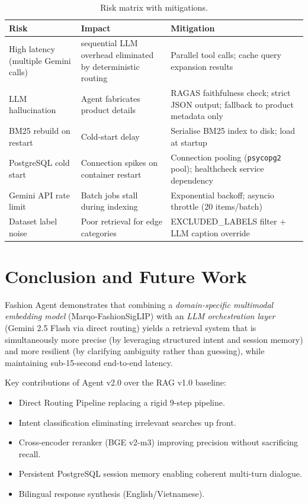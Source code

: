 \documentclass[12pt,a4paper]{article}
\begin{document}
\begin{table}[H]
\centering
\begin{tabularx}{\linewidth}{lXX}
\toprule
\textbf{Risk} & \textbf{Impact} & \textbf{Mitigation} \\
\midrule
High latency (multiple Gemini calls) & sequential LLM overhead eliminated by deterministic routing & Parallel tool calls; cache query expansion results \\
LLM hallucination & Agent fabricates product details & RAGAS faithfulness check; strict JSON output; fallback to product metadata only \\
BM25 rebuild on restart & Cold-start delay & Serialise BM25 index to disk; load at startup \\
PostgreSQL cold start & Connection spikes on container restart & Connection pooling (\texttt{psycopg2} pool); healthcheck service dependency \\
Gemini API rate limit & Batch jobs stall during indexing & Exponential backoff; asyncio throttle (20 items/batch) \\
Dataset label noise & Poor retrieval for edge categories & EXCLUDED\_LABELS filter + LLM caption override \\
\bottomrule
\end{tabularx}
\caption{Risk matrix with mitigations.}
\label{tab:risks}
\end{table}

\section{Conclusion and Future Work}
\label{sec:conclusion}

Fashion Agent demonstrates that combining a \emph{domain-specific
multimodal embedding model} (Marqo-FashionSigLIP) with an
\emph{LLM orchestration layer} (Gemini 2.5 Flash via direct routing)
yields a retrieval system that is simultaneously more precise
(by leveraging structured intent and session memory) and more
resilient (by clarifying ambiguity rather than guessing), while
maintaining sub-15-second end-to-end latency.

Key contributions of Agent v2.0 over the RAG v1.0 baseline:
\begin{itemize}
  \item Direct Routing Pipeline replacing a rigid 9-step pipeline.
  \item Intent classification eliminating irrelevant searches up front.
  \item Cross-encoder reranker (BGE v2-m3) improving precision without
        sacrificing recall.
  \item Persistent PostgreSQL session memory enabling coherent
        multi-turn dialogue.
  \item Bilingual response synthesis (English/Vietnamese).
\end{itemize}
\end{document}
